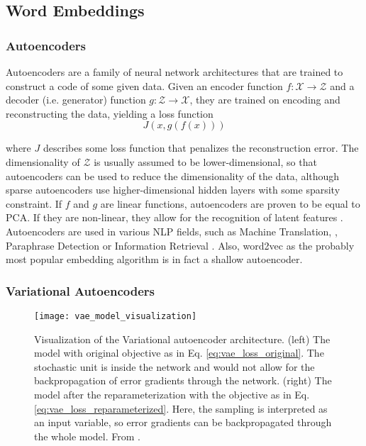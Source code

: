 \documentclass[6pt]{article}
\begin{document}
\subsection{Word Embeddings}
\label{Word Embeddings}
\subsubsection{Autoencoders}

Autoencoders are a family of neural network architectures that are trained to construct a code of some given data. Given an encoder function $f: \mathcal{X} \rightarrow \mathcal{Z}$ and a decoder (i.e. generator) function $g: \mathcal{Z} \rightarrow \mathcal{X}$, they are trained on encoding and reconstructing the data, yielding a loss function
\begin{equation}
J(x,g(f(x)))
\end{equation}
 
where $J$ describes some loss function that penalizes the reconstruction error. The dimensionality of $\mathcal{Z}$ is usually assumed to be lower-dimensional, so that autoencoders can be used to reduce the dimensionality of the data, although sparse autoencoders use higher-dimensional hidden layers with some sparsity constraint. If $f$ and $g$ are linear functions, autoencoders are proven to be equal to PCA. If they are non-linear, they allow for the recognition of latent features \citep{hinton2006reducing}. Autoencoders are used in various NLP fields, such as Machine Translation, \citep{lauly2014autoencoder,zhang2014bilingually}, Paraphrase Detection  \citep{socher2011dynamic} or Information Retrieval \citep{silberer2014learning,le2014distributed}. Also, word2vec \citep{mikolov2013efficient,mikolov2013distributed,goldberg2014word2vec} as the probably most popular embedding algorithm is in fact a shallow autoencoder.
\subsubsection{Variational Autoencoders}
\label{Variational Autoencoders}
\begin{figure}[h!] %
   \centering
   \texttt{[image: vae\_model\_visualization]} 
   \caption{Visualization of the Variational autoencoder architecture. (left) The model with original objective as in Eq. \ref{eq:vae_loss_original}. The stochastic unit is inside the network and would not allow for the backpropagation of error gradients through the network. (right) The model after the reparameterization with the objective as in Eq. \ref{eq:vae_loss_reparameterized}. Here, the sampling is interpreted as an input variable, so error gradients can be backpropagated through the whole model. From \cite{doersch2016tutorial}.}
   \label{fig:vae_model_visualization}
\end{figure}
\end{document}

